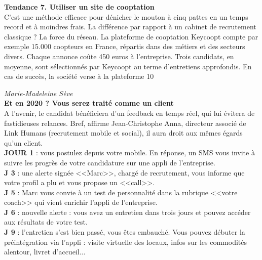\documentclass[11pt,twoside,a4paper]{article}
\begin{document}
\textbf{Tendance 7. Utiliser un site de cooptation}~\\

C'est une m{\'e}thode efficace pour d{\'e}nicher le mouton {\`a} cinq pattes en un temps record et {\`a} moindres frais. La diff{\'e}rence par rapport {\`a} un cabinet de recrutement classique ? La force du r{\'e}seau. La plateforme de cooptation Keycoopt compte par exemple 15.000 coopteurs en France, r{\'e}partis dans des m{\'e}tiers et des secteurs divers. Chaque annonce co{\^u}te 450 euros {\`a} l'entreprise. Trois candidats, en moyenne, sont s{\'e}lectionn{\'e}s par Keycoopt au terme d'entretiens approfondis. En cas de succ{\`e}s, la soci{\'e}t{\'e} verse {\`a} la plateforme 10%

\emph{Marie-Madeleine S{\`e}ve}~\\

\textbf{Et en 2020 ? Vous serez trait{\'e} comme un client}~\\

A l'avenir, le candidat b{\'e}n{\'e}ficiera d'un feedback en temps r{\'e}el, qui lui {\'e}vitera de fastidieuses relances. Bref, affirme Jean-Christophe Anna, directeur associ{\'e} de Link Humans (recrutement mobile et social), il aura droit aux m{\^e}mes {\'e}gards qu'un client. ~\\

\textbf{JOUR 1} : vous postulez depuis votre mobile. En r{\'e}ponse, un SMS vous invite {\`a} suivre les progr{\`e}s de votre candidature sur une appli de l'entreprise. ~\\

\textbf{J 3} : une alerte sign{\'e}e <<Marc>>, charg{\'e} de recrutement, vous informe que votre profil a plu et vous propose un <<call>>. ~\\

\textbf{J 5} : Marc vous convie {\`a} un test de personnalit{\'e} dans la rubrique <<votre coach>> qui vient enrichir l'appli de l'entreprise. ~\\

\textbf{J 6} : nouvelle alerte : vous avez un entretien dans trois jours et pouvez acc{\'e}der aux r{\'e}sultats de votre test. ~\\

\textbf{J 9} : l'entretien s'est bien pass{\'e}, vous {\^e}tes embauch{\'e}. Vous pouvez d{\'e}buter la pr{\'e}int{\'e}gration via l'appli : visite virtuelle des locaux, infos sur les commodit{\'e}s alentour, livret d'accueil... ~\\
 
\end{document}
